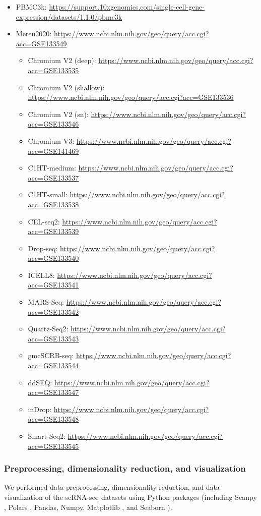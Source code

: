 \documentclass{article}
\begin{document}
\begin{itemize}
  \item PBMC3k: \url{https://support.10xgenomics.com/single-cell-gene-expression/datasets/1.1.0/pbmc3k}
  \item Mereu2020: \url{https://www.ncbi.nlm.nih.gov/geo/query/acc.cgi?acc=GSE133549}
  \begin{itemize}
    \item Chromium V2 (deep): \url{https://www.ncbi.nlm.nih.gov/geo/query/acc.cgi?acc=GSE133535}
    \item Chromium V2 (shallow): \url{https://www.ncbi.nlm.nih.gov/geo/query/acc.cgi?acc=GSE133536}
    \item Chromium V2 (sn): \url{https://www.ncbi.nlm.nih.gov/geo/query/acc.cgi?acc=GSE133546}
    \item Chromium V3: \url{https://www.ncbi.nlm.nih.gov/geo/query/acc.cgi?acc=GSE141469}
    \item C1HT-medium: \url{https://www.ncbi.nlm.nih.gov/geo/query/acc.cgi?acc=GSE133537}
    \item C1HT-small: \url{https://www.ncbi.nlm.nih.gov/geo/query/acc.cgi?acc=GSE133538}
    \item CEL-seq2: \url{https://www.ncbi.nlm.nih.gov/geo/query/acc.cgi?acc=GSE133539}
    \item Drop-seq: \url{https://www.ncbi.nlm.nih.gov/geo/query/acc.cgi?acc=GSE133540}
    \item ICELL8: \url{https://www.ncbi.nlm.nih.gov/geo/query/acc.cgi?acc=GSE133541}
    \item MARS-Seq: \url{https://www.ncbi.nlm.nih.gov/geo/query/acc.cgi?acc=GSE133542}
    \item Quartz-Seq2: \url{https://www.ncbi.nlm.nih.gov/geo/query/acc.cgi?acc=GSE133543}
    \item gmcSCRB-seq: \url{https://www.ncbi.nlm.nih.gov/geo/query/acc.cgi?acc=GSE133544}
    \item ddSEQ: \url{https://www.ncbi.nlm.nih.gov/geo/query/acc.cgi?acc=GSE133547}
    \item inDrop: \url{https://www.ncbi.nlm.nih.gov/geo/query/acc.cgi?acc=GSE133548}
    \item Smart-Seq2: \url{https://www.ncbi.nlm.nih.gov/geo/query/acc.cgi?acc=GSE133545}
  \end{itemize}
\end{itemize}

\subsubsection*{Preprocessing, dimensionality reduction, and visualization}
We performed data preprocessing, dimensionality reduction, and data visualization of the scRNA-seq datasets 
using Python packages (including Scanpy \cite{scanpy}, Polars \cite{polars}, Pandas, Numpy, Matplotlib \cite{matplotlib}, and Seaborn \cite{seaborn}).
\end{document}
